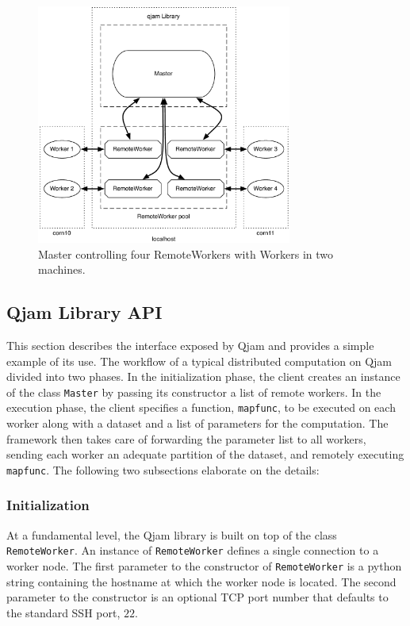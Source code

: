 \documentclass[%
  final,
  notitlepage,
  narroweqnarray,
  inline,
]{ieee}
\begin{document}
\begin{figure}[h!]
  \begin{center}
    \includegraphics[width=3.3in]{fwk_diagram/fwk_diagram.pdf}
  \end{center}
  \caption{Master controlling four RemoteWorkers with Workers in two machines.}
  \label{diagram}
\end{figure}

\subsection{Qjam Library API}
\label{Library}

This section describes the interface exposed by Qjam and provides a simple
example of its use. The workflow of a typical distributed computation on Qjam
divided into two phases. In the initialization phase, the client creates an
instance of the class \texttt{Master} by passing its constructor a list of
remote workers. In the execution phase, the client specifies a function,
\texttt{mapfunc}, to be executed on each worker along with a dataset and a list
of parameters for the computation. The framework then takes care of forwarding
the parameter list to all workers, sending each worker an adequate partition of
the dataset, and remotely executing \texttt{mapfunc}. The following two
subsections elaborate on the details:

\subsubsection{Initialization}

At a fundamental level, the Qjam library is built on top of the class
\texttt{RemoteWorker}. An instance of \texttt{RemoteWorker} defines
a single connection to a worker node. The first parameter to the constructor of
\texttt{RemoteWorker} is a python string containing the hostname at which the
worker node is located. The second parameter to the constructor is an optional
TCP port number that defaults to the standard SSH port, $22$.
\end{document}
